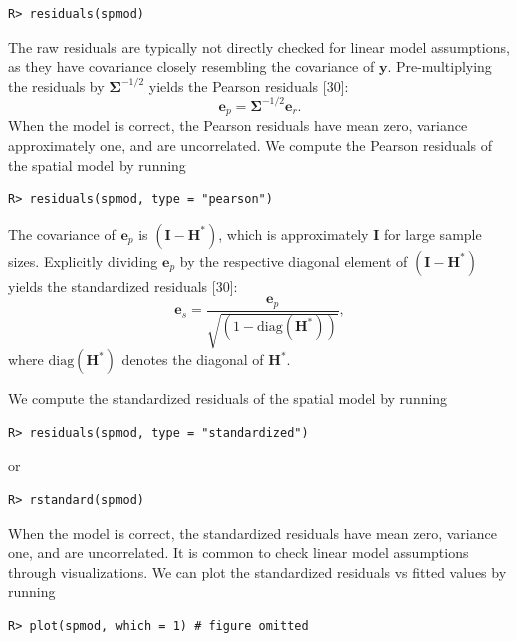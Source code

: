 \documentclass[10pt,letterpaper]{article}
\begin{document}
\begin{verbatim}
R> residuals(spmod)
\end{verbatim}

The raw residuals are typically not directly checked for linear model
assumptions, as they have covariance closely resembling the covariance
of \(\mathbf{y}\). Pre-multiplying the residuals by
\(\boldsymbol{\Sigma}^{-1/2}\) yields the Pearson residuals {[}30{]}:
\begin{equation*}
  \mathbf{e}_{p} = \boldsymbol{\Sigma}^{-1/2}\mathbf{e}_{r}.
\end{equation*} When the model is correct, the Pearson residuals have
mean zero, variance approximately one, and are uncorrelated. We compute
the Pearson residuals of the spatial model by running

\begin{verbatim}
R> residuals(spmod, type = "pearson")
\end{verbatim}

The covariance of \(\mathbf{e}_{p}\) is \((\mathbf{I} - \mathbf{H}^*)\),
which is approximately \(\mathbf{I}\) for large sample sizes. Explicitly
dividing \(\mathbf{e}_{p}\) by the respective diagonal element of
\((\mathbf{I} - \mathbf{H}^*)\) yields the standardized residuals
{[}30{]}: \begin{equation*}
  \mathbf{e}_{s} = \frac{\mathbf{e}_{p}}{\sqrt{(1 - \text{diag}(\mathbf{H}^*))}},
\end{equation*} where \(\text{diag}(\mathbf{H}^*)\) denotes the diagonal
of \(\mathbf{H}^*\).

We compute the standardized residuals of the spatial model by running

\begin{verbatim}
R> residuals(spmod, type = "standardized")
\end{verbatim}

or

\begin{verbatim}
R> rstandard(spmod)
\end{verbatim}

When the model is correct, the standardized residuals have mean zero,
variance one, and are uncorrelated. It is common to check linear model
assumptions through visualizations. We can plot the standardized
residuals vs fitted values by running

\begin{verbatim}
R> plot(spmod, which = 1) # figure omitted
\end{verbatim}
\end{document}
